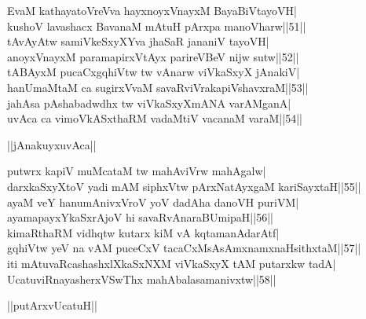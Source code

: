 \documentclass{article}
\begin{document}
EvaM kathayatoVreVva hayxnoyxVnayxM BayaBiVtayoVH|\\
kushoV lavashacx BavanaM mAtuH pArxpa manoVharw||51||\\
tAvAyAtw samiVkeSxyXYva j{ha}SaR jananiV tayoVH|\\
anoyxVnayxM paramapirxVtAyx parireVBeV nijw sutw||52||\\
tABAyxM pucaCxgqhiVtw tw vAnarw viVkaSxyX jAnakiV|\\
hanUmaMtaM ca sugirxVvaM savaRviVrakapiVshavxraM||53||\\
ja{hA}sa pAshabadwdhx tw viVkaSxyXmANA varAMganA|\\
uvAca ca vimoVkASxthaRM vadaMtiV vacanaM varaM||54||\\

\begin{center}
||jAnakuyxuvAca||
\end{center}

putwrx kapiV muMcataM tw mahAviVrw mahAgalw|\\
darxkaSxyXtoV yadi mAM siphxVtw pArxNatAyxgaM kariSayxtaH||55||\\
ayaM veY hanumAnivxVroV yoV dadAha danoVH puriVM|\\
ayamapayxYkaSxrAjoV hi savaRvAnaraBUmipaH||56||\\
kimaRthaRM vidhqtw kutarx kiM vA kqtamanAdarAtf|\\
gqhiVtw yeV na vAM puceCxV tacaCxMsAsAmxnamxnaHsithxtaM||57||\\
iti mAtuvaRcashashxlXkaSxNXM viVkaSxyX tAM putarxkw tadA|\\
UcatuviRnayasherxVSwThx mahAbalasamanivxtw||58||\\

\begin{center}
||putArxvUcatuH||
\end{center}
\end{document}
